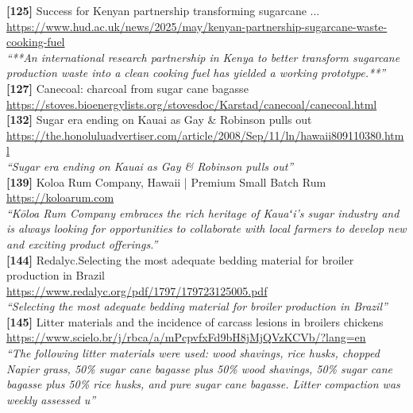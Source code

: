 \textbf{[125]} Success for Kenyan partnership transforming sugarcane ...\\[0.15em]
\url{https://www.hud.ac.uk/news/2025/may/kenyan-partnership-sugarcane-waste-cooking-fuel}\\[0.2em]
\emph{``**An international research partnership in Kenya to better transform sugarcane production waste into a clean cooking fuel has yielded a working prototype.**''}\\[0.45em]

\textbf{[127]} Canecoal: charcoal from sugar cane bagasse\\[0.15em]
\url{https://stoves.bioenergylists.org/stovesdoc/Karstad/canecoal/canecoal.html}\\[0.2em]

\textbf{[132]} Sugar era ending on Kauai as Gay \& Robinson pulls out\\[0.15em]
\url{https://the.honoluluadvertiser.com/article/2008/Sep/11/ln/hawaii809110380.html}\\[0.2em]
\emph{``Sugar era ending on Kauai as Gay \& Robinson pulls out''}\\[0.45em]

\textbf{[139]} Koloa Rum Company, Hawaii | Premium Small Batch Rum\\[0.15em]
\url{https://koloarum.com}\\[0.2em]
\emph{``Kōloa Rum Company embraces the rich heritage of Kauaʻi’s sugar industry and is always looking for opportunities to collaborate with local farmers to develop new and exciting product offerings.''}\\[0.45em]

\textbf{[144]} Redalyc.Selecting the most adequate bedding material for broiler production in Brazil\\[0.15em]
\url{https://www.redalyc.org/pdf/1797/179723125005.pdf}\\[0.2em]
\emph{``Selecting the most adequate bedding material for broiler production in Brazil''}\\[0.45em]

\textbf{[145]} Litter materials and the incidence of carcass lesions in broilers chickens\\[0.15em]
\url{https://www.scielo.br/j/rbca/a/mPcpvfxFd9bH8jMjQVzKCVb/?lang=en}\\[0.2em]
\emph{``The following litter materials were used: wood shavings, rice husks, chopped Napier grass, 50\% sugar cane bagasse plus 50\% wood shavings, 50\% sugar cane bagasse plus 50\% rice husks, and pure sugar cane bagasse. Litter compaction was weekly assessed u''}\\[0.45em]

